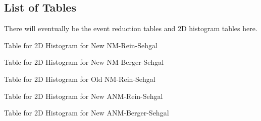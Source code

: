 \documentclass[11pt]{article}
\begin{document}
\subsection{List of Tables}
There will eventually be the event reduction tables and 2D histogram tables here.

\newpage
\begin{landscape}
\begin{table}
\centering
\caption{Table for 2D Histogram for New NM-Rein-Sehgal}
\begin{adjustbox}{width=\paperwidth}
\end{adjustbox}
\end{table}
\end{landscape}

\newpage
\begin{landscape}
\begin{table}
\centering
\caption{Table for 2D Histogram for New NM-Berger-Sehgal}
\begin{adjustbox}{width=\paperwidth}
\end{adjustbox}
\end{table}
\end{landscape}

\newpage
\begin{landscape}
\begin{table}
\centering
\caption{Table for 2D Histogram for Old NM-Rein-Sehgal}
\begin{adjustbox}{width=\paperwidth}
\end{adjustbox}
\end{table}
\end{landscape}

\newpage
\begin{landscape}
\begin{table}
\centering
\caption{Table for 2D Histogram for New ANM-Rein-Sehgal}
\begin{adjustbox}{width=\paperwidth}
\end{adjustbox}
\end{table}
\end{landscape}

\newpage
\begin{landscape}
\begin{table}
\centering
\caption{Table for 2D Histogram for New ANM-Berger-Sehgal}
\begin{adjustbox}{width=\paperwidth}
\end{adjustbox}
\end{table}
\end{landscape}
\end{document}
